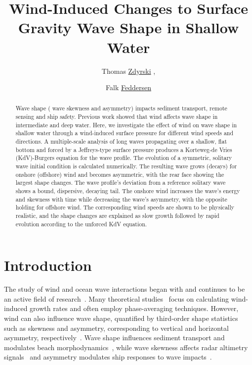 \documentclass{jfm}
\title{Wind-Induced Changes to Surface Gravity Wave Shape in Shallow Water}
\author{Thomas \href{https://orcid.org/0000-0003-3039-172X}{Zdyrski}\aff{1}
  \corresp{\email{tzdyrski@uscd.edu}},
  \and Falk \href{https://orcid.org/0000-0002-5488-9074}{Feddersen}\aff{1}}
\affiliation{\aff{1}Scripps Institution of Oceanography, UCSD, La Jolla, CA 92092-0209, USA}
\begin{document}
\maketitle

\begin{abstract}
Wave shape (\eg{} wave skewness and asymmetry) impacts sediment
transport, remote sensing and ship safety.
Previous work showed that wind affects wave shape in intermediate and
deep water.
Here, we investigate the effect of wind on wave shape in shallow water
through a wind-induced surface pressure for different wind speeds and
directions.
A multiple-scale analysis of long waves propagating over a shallow,
flat bottom and forced by a Jeffreys-type surface pressure produces a
Korteweg-de Vries (KdV)-Burgers equation for the wave profile.
The evolution of a symmetric, solitary wave initial condition is
calculated numerically.
The resulting wave grows (decays) for onshore (offshore) wind and
becomes asymmetric, with the rear face showing the largest shape
changes.
The wave profile's deviation from a reference solitary wave shows a
bound, dispersive, decaying tail.
The onshore wind increases the wave's energy and skewness with time
while decreasing the wave's asymmetry, with the opposite holding for
offshore wind.
The corresponding wind speeds are shown to be physically realistic, and
the shape changes are explained as slow growth followed by rapid
evolution according to the unforced KdV equation.
\end{abstract}

\vspace{-0.7cm}
\section{Introduction}

The study of wind and ocean wave interactions began with
\citet{jeffreys1925formation} and continues to be an active field of
research~\citep[\eg][]{janssen1991quasi,donelan2006wave,sulivan2010dynamics}.
Many theoretical
studies~\citep[\eg][]{jeffreys1925formation,miles1957generation,phillips1957generation}
focus on calculating wind-induced growth rates and often employ
phase-averaging techniques.
However, wind can also influence wave shape, quantified by third-order
shape statistics such as skewness and asymmetry, corresponding to
vertical and horizontal asymmetry,
respectively~\citep[\eg][]{leykin1995asymmetry,feddersen2005wind,zdyrski2020wind}.
Wave shape influences sediment transport and modulates beach
morphodynamics~\citep[\eg][]{drake2001discrete,hoefel2003wave}, while
wave skewness affects radar altimetry
signals~\citep[\eg][]{hayne1980radar} and asymmetry modulates ship
responses to wave impacts~\citep[\eg][]{soares2008abnormal}.
\end{document}
